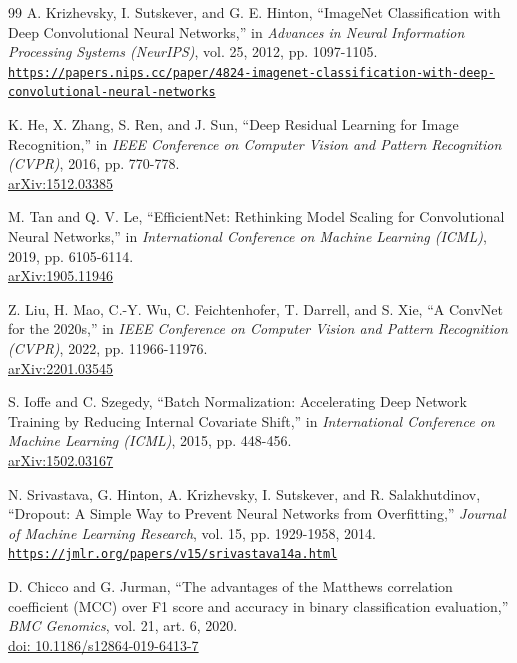 \documentclass{article}
\renewcommand{\url}[1]{\href{#1}{\nolinkurl{#1}}}
\begin{document}
\begin{thebibliography}{99}
A. Krizhevsky, I. Sutskever, and G. E. Hinton,
``ImageNet Classification with Deep Convolutional Neural Networks,''
in \textit{Advances in Neural Information Processing Systems (NeurIPS)}, vol. 25, 2012, pp. 1097-1105.\\
\url{https://papers.nips.cc/paper/4824-imagenet-classification-with-deep-convolutional-neural-networks}

K. He, X. Zhang, S. Ren, and J. Sun,
``Deep Residual Learning for Image Recognition,''
in \textit{IEEE Conference on Computer Vision and Pattern Recognition (CVPR)}, 2016, pp. 770-778.\\
\href{https://arxiv.org/abs/1512.03385}{arXiv:1512.03385}

M. Tan and Q. V. Le,
``EfficientNet: Rethinking Model Scaling for Convolutional Neural Networks,''
in \textit{International Conference on Machine Learning (ICML)}, 2019, pp. 6105-6114.\\
\href{https://arxiv.org/abs/1905.11946}{arXiv:1905.11946}

Z. Liu, H. Mao, C.-Y. Wu, C. Feichtenhofer, T. Darrell, and S. Xie,
``A ConvNet for the 2020s,''
in \textit{IEEE Conference on Computer Vision and Pattern Recognition (CVPR)}, 2022, pp. 11966-11976.\\
\href{https://arxiv.org/abs/2201.03545}{arXiv:2201.03545}

S. Ioffe and C. Szegedy,
``Batch Normalization: Accelerating Deep Network Training by Reducing Internal Covariate Shift,''
in \textit{International Conference on Machine Learning (ICML)}, 2015, pp. 448-456.\\
\href{https://arxiv.org/abs/1502.03167}{arXiv:1502.03167}

N. Srivastava, G. Hinton, A. Krizhevsky, I. Sutskever, and R. Salakhutdinov,
``Dropout: A Simple Way to Prevent Neural Networks from Overfitting,''
\textit{Journal of Machine Learning Research}, vol. 15, pp. 1929-1958, 2014.\\
\url{https://jmlr.org/papers/v15/srivastava14a.html}

D. Chicco and G. Jurman,
``The advantages of the Matthews correlation coefficient (MCC) over F1 score and accuracy in binary classification evaluation,''
\textit{BMC Genomics}, vol. 21, art. 6, 2020.\\
\href{https://doi.org/10.1186/s12864-019-6413-7}{doi: 10.1186/s12864-019-6413-7}


\end{thebibliography}
\end{document}
